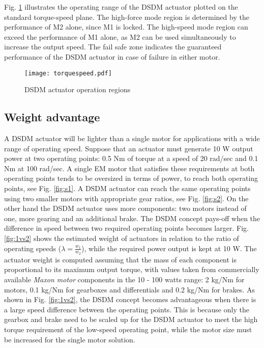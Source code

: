 Fig. \ref{fig:torquespeed} illustrates the operating range of the DSDM actuator plotted on the standard torque-speed plane. The high-force mode region is determined by the performance of M2 alone, since M1 is locked. The high-speed mode region can exceed the performance of M1 alone, as M2 can be used simultaneously to increase the output speed. The fail safe zone indicates the guaranteed performance of the DSDM actuator in case of failure in either motor. 

\begin{figure}[H]
	\centering
		\texttt{[image: torquespeed.pdf]}
	\caption[DSDM actuator operation regions]{DSDM actuator operation regions}
	\label{fig:torquespeed}
\end{figure}

\subsection{Weight advantage}
\label{sec:WeightAdvantage}


A DSDM actuator will be lighter than a single motor for applications with a wide range of operating speed. Suppose that an actuator must generate 10 W output power at two operating points: 0.5 Nm of torque at a speed of 20 rad/sec and 0.1 Nm at 100 rad/sec. A single EM motor that satisfies these requirements at both operating points tends to be oversized in terms of power, to reach both operating points, see Fig. \ref{fig:s1}. A DSDM actuator can reach the same operating points using two smaller motors with appropriate gear ratios, see Fig. \ref{fig:s2}. On the other hand the DSDM actuator uses more components: two motors instead of one, more gearing and an additional brake. The DSDM concept pays-off when the difference in speed between two required operating points becomes larger.  Fig. \ref{fig:1vs2} shows the estimated weight of actuators in relation to the ratio of operating speeds ($\lambda=\frac{w_1}{w_2}$), while the required power output is kept at 10 W. The actuator weight is computed assuming that the mass of each component is proportional to its maximum output torque, with values taken from commercially available \textit{Maxon motor} components in the 10 - 100 watts range: 2 kg/Nm for motors, 0.1 kg/Nm for gearboxes and differentials and 0.2 kg/Nm for brakes. As shown in Fig. \ref{fig:1vs2}, the DSDM concept becomes advantageous when there is a large speed difference between the operating points. This is because only the gearbox and brake need to be scaled up for the DSDM actuator to meet the high torque requirement of the low-speed operating point, while the motor size must be increased for the single motor solution.

